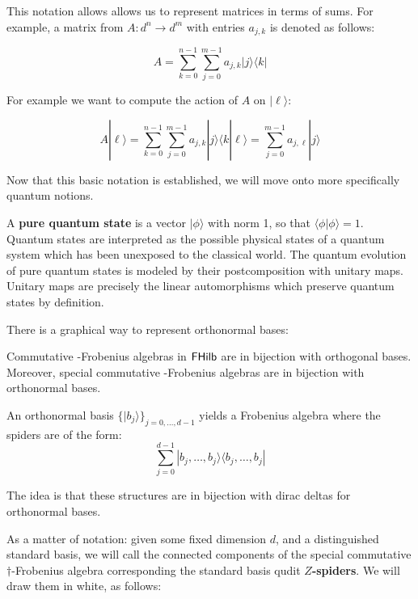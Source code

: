This notation allows allows us to represent matrices in terms of sums.  For example, a matrix from $A:d^n\to d^m$ with entries $a_{j,k}$ is denoted as follows:

$$
A  = \sum_{k=0}^{n-1} \sum_{j=0}^{m-1} a_{j,k}| j \rangle \langle k |
$$

For example we want to compute the  action of $A$ on $|\ell \rangle$:

$$
A|\ell\rangle 
  =  \sum_{k=0}^{n-1} \sum_{j=0}^{m-1} a_{j,k}| j \rangle \langle k | \ell \rangle
= 
 \sum_{j=0}^{m-1} a_{j,\ell}| j \rangle
$$


Now that this basic notation is established, we will move onto more specifically quantum notions.


A {\bf pure quantum state} is a vector $|\phi \rangle$ with norm 1, so that $\langle \phi | \phi \rangle =1$. Quantum states are interpreted as the possible physical states of a quantum system which has been unexposed to the classical world.  The quantum evolution of pure quantum states is modeled by their postcomposition with unitary maps.  Unitary maps are precisely the linear automorphisms which preserve quantum states by definition.

There is a graphical way to represent orthonormal bases:

\begin{lemma}
\label{lem:specialdagfa}
Commutative \dag-Frobenius algebras in $\mathsf{FHilb}$ are in bijection with orthogonal bases.  Moreover, special commutative \dag-Frobenius algebras are in bijection with orthonormal bases.


An orthonormal basis $\{ |b_j\rangle \}_{j=0,\ldots, d-1}$ yields a Frobenius algebra where the spiders are of the form:
$$
\sum_{j=0}^{d-1} |b_j, \ldots, b_j \rangle\langle b_j,\ldots, b_j|
$$
\end{lemma}
The idea is that these structures are in bijection with dirac deltas for orthonormal bases.  


As a matter of notation: given some fixed dimension $d$, and a distinguished standard basis, we will call the  connected components of the special commutative $\dag$-Frobenius algebra corresponding the standard basis qudit {\bf $Z$-spiders}.  We will draw them in white, as follows:

